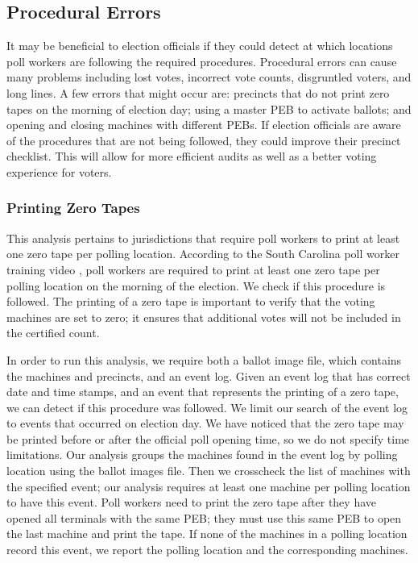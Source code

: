 \subsection{Procedural Errors}
It may be beneficial to election officials if they could detect at which locations poll workers are following the required procedures. Procedural errors can cause many problems including lost votes, incorrect vote counts, disgruntled voters, and long lines. A few errors that might occur are: precincts that do not print zero tapes on the morning of election day; using a master PEB to activate ballots; and opening and closing machines with different PEBs. If election officials are aware of the procedures that are not being followed, they could improve their precinct checklist. This will allow for more efficient audits as well as a better voting experience for voters.

\subsubsection{Printing Zero Tapes}
This analysis pertains to jurisdictions that require poll workers to print at least one zero tape per polling location.  According to the South Carolina poll worker training video \cite{??}, poll workers are required to print at least one zero tape per polling location on the morning of the election.  We check if this procedure is followed.  The printing of a zero tape is important to verify that the voting machines are set to zero; it ensures that additional votes will not be included in the certified count.  

In order to run this analysis, we require both a ballot image file, which contains the machines and precincts, and an event log.  Given an event log that has correct date and time stamps, and an event that represents the printing of a zero tape, we can detect if this procedure was followed.  We limit our search of the event log to events that occurred on election day.  We have noticed that the zero tape may be printed before or after the official poll opening time, so we do not specify time limitations.  Our analysis groups the machines found in the event log by polling location using the ballot images file.  Then we crosscheck the list of machines with the specified event; our analysis requires at least one machine per polling location to have this event.  Poll workers need to print the zero tape after they have opened all terminals with the same PEB; they must use this same PEB to open the last machine and print the tape.  If none of the machines in a polling location record this event, we report the polling location and the corresponding machines.

